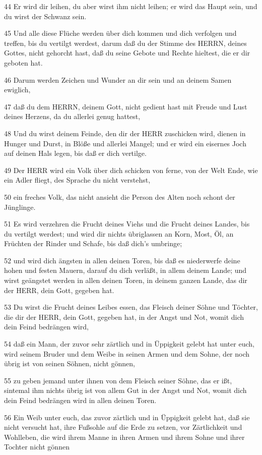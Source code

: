 \par 44 Er wird dir leihen, du aber wirst ihm nicht leihen; er wird das Haupt sein, und du wirst der Schwanz sein.
\par 45 Und alle diese Flüche werden über dich kommen und dich verfolgen und treffen, bis du vertilgt werdest, darum daß du der Stimme des HERRN, deines Gottes, nicht gehorcht hast, daß du seine Gebote und Rechte hieltest, die er dir geboten hat.
\par 46 Darum werden Zeichen und Wunder an dir sein und an deinem Samen ewiglich,
\par 47 daß du dem HERRN, deinem Gott, nicht gedient hast mit Freude und Lust deines Herzens, da du allerlei genug hattest,
\par 48 Und du wirst deinem Feinde, den dir der HERR zuschicken wird, dienen in Hunger und Durst, in Blöße und allerlei Mangel; und er wird ein eisernes Joch auf deinen Hals legen, bis daß er dich vertilge.
\par 49 Der HERR wird ein Volk über dich schicken von ferne, von der Welt Ende, wie ein Adler fliegt, des Sprache du nicht verstehst,
\par 50 ein freches Volk, das nicht ansieht die Person des Alten noch schont der Jünglinge.
\par 51 Es wird verzehren die Frucht deines Viehs und die Frucht deines Landes, bis du vertilgt werdest; und wird dir nichts übriglassen an Korn, Most, Öl, an Früchten der Rinder und Schafe, bis daß dich's umbringe;
\par 52 und wird dich ängsten in allen deinen Toren, bis daß es niederwerfe deine hohen und festen Mauern, darauf du dich verläßt, in allem deinem Lande; und wirst geängstet werden in allen deinen Toren, in deinem ganzen Lande, das dir der HERR, dein Gott, gegeben hat.
\par 53 Du wirst die Frucht deines Leibes essen, das Fleisch deiner Söhne und Töchter, die dir der HERR, dein Gott, gegeben hat, in der Angst und Not, womit dich dein Feind bedrängen wird,
\par 54 daß ein Mann, der zuvor sehr zärtlich und in Üppigkeit gelebt hat unter euch, wird seinem Bruder und dem Weibe in seinen Armen und dem Sohne, der noch übrig ist von seinen Söhnen, nicht gönnen,
\par 55 zu geben jemand unter ihnen von dem Fleisch seiner Söhne, das er ißt, sintemal ihm nichts übrig ist von allem Gut in der Angst und Not, womit dich dein Feind bedrängen wird in allen deinen Toren.
\par 56 Ein Weib unter euch, das zuvor zärtlich und in Üppigkeit gelebt hat, daß sie nicht versucht hat, ihre Fußsohle auf die Erde zu setzen, vor Zärtlichkeit und Wohlleben, die wird ihrem Manne in ihren Armen und ihrem Sohne und ihrer Tochter nicht gönnen
